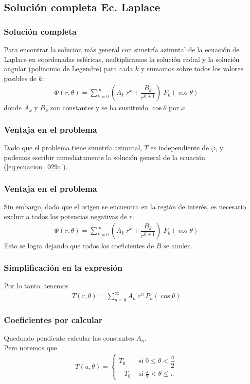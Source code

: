 \subsection{Solución completa Ec. Laplace}
\begin{frame}
\frametitle{Solución completa}
 Para encontrar la solución más general con simetría azimutal de la ecuación de Laplace en coordenadas esféricas, multiplicamos la solución radial y la solución angular (polinomio de Legendre) para cada $k$ y sumamos sobre todos los valores posibles de $k$:
 \pause
\begin{align}
\Phi (r, \theta) = \sum_{k=0}^{\infty} \left( A_{k} \; r^{k} + \dfrac{B_{k}}{r^{k+1}} \right) \; P_{k} (\cos \theta)
\label{eq:ecuacion_029a}
\end{align}
donde $A_{k}$ y $B_{k}$ son constantes y se ha sustituido $\cos \theta$ por $x$.
\end{frame}
\begin{frame}
\frametitle{Ventaja en el problema}
Dado que el problema tiene simetría azimutal, $T$ es independiente de $\varphi$, y podemos escribir inmediatamente la solución general de la ecuación (\ref{eq:ecuacion_029a}).
\end{frame}
\begin{frame}
\frametitle{Ventaja en el problema}
Sin embargo, dado que el origen se encuentra en la región de interés, es necesario excluir a todos los potencias negativas de $r$.
\begin{align*}
\Phi (r, \theta) = \sum_{k=0}^{\infty} \left( A_{k} \; r^{k} + \dfrac{B_{k}}{r^{k+1}} \right) \; P_{k} (\cos \theta)
\end{align*}
\pause    
Esto se logra dejando que todos los coeficientes de $B$ se anulen.
\end{frame}
\begin{frame}
\frametitle{Simplificación en la expresión}
Por lo tanto, tenemos
\begin{align}
T(r, \theta) = \sum_{n=0}^{\infty} A_{n} \; r^{n} \, P_{n} (\cos \theta)
\label{eq:ecuacion_050a}
\end{align}
\end{frame}
\begin{frame}
\frametitle{Coeficientes por calcular}
Quedando pendiente calcular las constantes $A_{n}$.
\\
\bigskip
\pause
Pero notemos que
\begin{align*}
T(a, \theta) = 
\begin{cases}
T_{0} & \mbox{ si } 0 \leq \theta < \dfrac{\pi}{2} \\[0.5em]
-T_{0} & \mbox{ si } \frac{\pi}{2} < \theta \leq \pi 
\end{cases}
\end{align*}
\end{frame}
